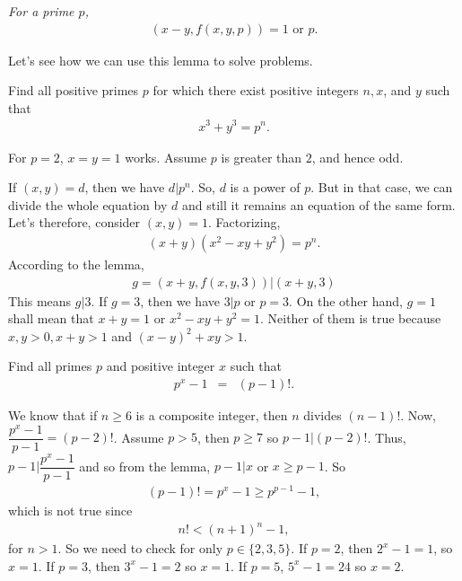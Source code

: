 \documentclass[main.tex]{subfile}
\begin{document}
	\begin{corollary}\slshape
		For a prime $p$,
		\begin{align*}
			(x-y,f(x,y,p))=1 \text{ or } p.
		\end{align*}
	\end{corollary}
	
Let's see how we can use this lemma to solve problems.
	
	\begin{problem}[Hungary 2000]
		Find all positive primes $p$ for which there exist positive
		integers $n,x$, and $y$ such that 
		\begin{align*}
			x^3+y^3=p^n.
		\end{align*}
	\end{problem}
	
	\begin{solution}
		For $p=2$, $x=y=1$ works. Assume $p$ is greater than $2$, and hence odd.
		
		If $(x, y)=d$, then we have $d|p^n$. So, $d$ is a power of $p$. But in that case, we can divide the whole equation by $d$ and still it remains an equation of the same form. Let's therefore, consider $(x, y)=1$. Factorizing, 
		\begin{align*}
			(x+y)(x^2-xy+y^2)=p^n.
		\end{align*}
		According to the lemma, 
		\begin{align*}
			g=\left(x+y, f(x, y, 3)\right)\big|(x+y,3)
		\end{align*}
		This means $g|3$. If $g=3$, then we have $3|p$ or $p=3$. On the other hand, $g=1$ shall mean that $x+y=1$ or $x^2-xy+y^2=1$. Neither of them is true because $x,y>0,x+y>1$ and $(x-y)^2+xy>1$. 
	\end{solution}
	
	\begin{problem}
		Find all primes $p$ and positive integer $x$ such that
			\begin{eqnarray*}
				p^x-1 & = & (p-1)!.
			\end{eqnarray*}
	\end{problem}
	
	\begin{solution}
		We know that if $n\geq 6$ is a composite integer, then $n$ divides $(n-1)!$. Now, $\dfrac{p^x-1}{p-1}=(p-2)!$. Assume $p>5$, then $p\geq7$ so $p-1|(p-2)!$. Thus, $p-1 \big| \dfrac{p^x-1}{p-1}$ and so from the lemma, $p-1|x$ or $x\geq p-1$. So
			\begin{align*}
				(p-1)!  =  p^x-1\geq p^{p-1}-1,
			\end{align*}
		which is not true since 
			\begin{align*}
				n!  < (n+1)^n-1,
			\end{align*}
		for $n>1$. So we need to check for only $p\in\{2,3,5\}$. If $p=2$, then $2^x-1=1$, so $x=1$. If $p=3$, then $3^x-1=2$ so $x=1$. If $p=5$, $5^x-1=24$ so $x=2$.
	\end{solution}
	
\end{document}
